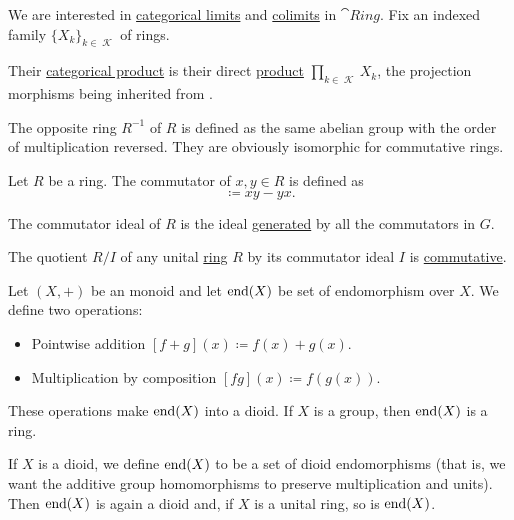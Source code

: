 \begin{proposition}\label{thm:ring_categorical_limits}
  We are interested in \hyperref[def:categorical_limit]{categorical limits} and \hyperref[def:categorical_colimit]{colimits} in \( \cat{Ring} \). Fix an indexed family  \( \{ X_k \}_{k \in \mscrK} \) of rings.
  \begin{thmenum}
     Their \hyperref[def:categorical_product]{categorical product} is their direct \hyperref[def:semiring_direct_product]{product} \( \prod_{k \in \mscrK} X_k \), the projection morphisms being inherited from .
  \end{thmenum}
\end{proposition}

\begin{definition}\label{def:opposite_ring}\mcite\cite[555]{Knapp2016BasicAlgebra}
  The opposite ring \( R^{-1} \) of \( R \) is defined as the same abelian group with the order of multiplication reversed. They are obviously isomorphic for commutative rings.
\end{definition}

\begin{definition}\label{def:ring_commutator}
  Let \( R \) be a ring. The commutator of \( x, y \in R \) is defined as
  \begin{equation*}
    [x, y] \coloneqq xy - yx.
  \end{equation*}

  The commutator ideal of \( R \) is the ideal \hyperref[def:generated_ring_ideal]{generated} by all the commutators in \( G \).
\end{definition}

\begin{proposition}\label{thm:quotient_by_commutator_ideal}
  The quotient \( R / I \) of any unital \hyperref[def:semiring/unital_ring]{ring} \( R \) by its commutator ideal \( I \) is \hyperref[def:semiring/commutative_ring]{commutative}.
\end{proposition}

\begin{definition}\label{def:endomorphism_dioid}
  Let \( (X, +) \) be an monoid and let \( \operatorname{end}(X) \) be set of endomorphism over \( X \). We define two operations:
  \begin{itemize}
    \item Pointwise addition \( [f + g](x) \coloneqq f(x) + g(x) \).
    \item Multiplication by composition \( [fg](x) \coloneqq f(g(x)) \).
  \end{itemize}

  These operations make \( \operatorname{end}(X) \) into a dioid. If \( X \) is a group, then \( \operatorname{end}(X) \) is a ring.

  If \( X \) is a dioid, we define \( \operatorname{end}(X) \) to be a set of dioid endomorphisms (that is, we want the additive group homomorphisms to preserve multiplication and units). Then \( \operatorname{end}(X) \) is again a dioid and, if \( X \) is a unital ring, so is \( \operatorname{end}(X) \).
\end{definition}

